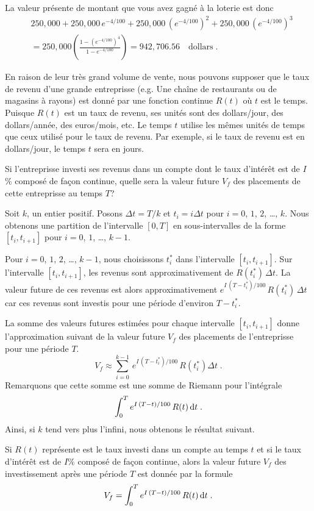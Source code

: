 {\begin{egg}
La valeur présente de montant que vous avez gagné à la loterie est donc
\begin{align*}
& 250,000 + 250,000\,e^{-4/100} + 250,000\,\left(e^{-4/100}\right)^2
+ 250,000\,\left(e^{-4/100}\right)^3 \\
&= 250, 000 \left( \frac{1- \left(e^{-4/100}\right)^4}{1-e^{-4/100}} \right)
= 942,706.56 \quad \text{dollars}\; .
\end{align*}
\end{egg}

En raison de leur très grand volume de vente, nous pouvons supposer que le
taux de revenu d'une grande entreprisse (e.g. Une chaîne de restaurants
ou de magasins à rayons) est donné par une fonction continue $R(t)$ où
$t$ est le temps.  Puisque $R(t)$ est un taux de revenu, ses unités
sont des dollars/jour, des dollars/année, des euros/mois, etc.  Le
temps $t$ utilise les mêmes unités de temps que ceux utilisé pour le
taux de revenu.  Par exemple, si le taux de revenu est en
dollars/jour, le temps $t$ sera en jours.

Si l'entreprisse investi ses revenus dans un compte dont le taux
d'intérêt est de $I$\% composé de façon continue, quelle sera la valeur
future $V_f$ des placements de cette entreprisse au temps $T$?

Soit $k$, un entier positif.  Posons
$\Delta t = T/k$ et $t_i = i \Delta t$
pour $i=0$, $1$, $2$, \ldots, $k$.  Nous obtenons une partition de l'intervalle
$[0,T]$ en sous-intervalles de la forme $[t_i,t_{i+1}]$ pour $i=0$, $1$,
\ldots, $k-1$.

Pour $i=0$, $1$, $2$, \ldots, $k-1$, nous choisissons $t_i^\ast$ dans
l'intervalle $[t_i,t_{i+1}]$.  Sur l'intervalle $[t_i, t_{i+1}]$, les
revenus sont approximativement de $R(t_i^\ast)\, \Delta t$.  La valeur
future de ces revenus est alors approximativement
$\displaystyle e^{I\,(T-t_i^\ast)/100} \,R(t_i^\ast)\, \Delta t$ car ces
revenus sont investis pour une période d'environ $T-t_i^\ast$.

La somme des valeurs futures estimées pour chaque intervalle
$[t_i,t_{i+1}]$ donne l'approximation suivant de la valeur future $V_f$
des placements de l'entreprisse pour une période $T$.
\[
V_f \approx \sum_{i=0}^{k-1} \,e^{I\,(T-t_i^\ast)/100} \,R(t_i^\ast) \Delta t \; .
\]
Remarquons que cette somme est une somme de Riemann pour l'intégrale
\[
\int_0^T e^{I\,(T-t)/100} \,R(t) \,\mathrm{d}t \; .
\]
Ainsi, si $k$ tend vers plus l'infini, nous obtenons le résultat suivant.

\begin{focus}{\mth} 
Si $R(t)$ représente est le taux investi dans un compte au temps $t$
et si le taux d'intérêt est de $I$\% composé de façon continue, alors la
valeur future $V_f$ des investissement après une période $T$ est
donnée par la formule
\[
V_f = \int_0^T e^{I\,(T-t)/100} \,R(t) \,\mathrm{d}t \; .
\]
\end{focus}

}
